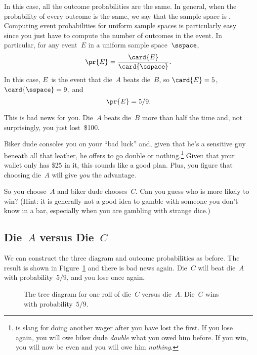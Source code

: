 In this case, all the outcome probabilities are the same.  In general,
when the probability of every outcome is the same, we say that the
sample space is .  Computing event probabilities for
uniform sample spaces is particularly easy since you just have to
compute the number of outcomes in the event.  In particular, for any
event~$E$ in a uniform sample space~$\sspace$,
\begin{equation}\label{eqn:14F1}
    \pr{E} = \frac{\card{E}}{\card{\sspace}}.
\end{equation}
In this case, $E$~is the event that die~$A$ beats die~$B$, so
$\card{E} = 5$, \ $\card{\sspace} = 9$, and
\begin{equation*}
    \pr{E} = 5/9.
\end{equation*}

This is bad news for you.  Die~$A$ beats die~$B$ more than half the
time and, not surprisingly, you just lost~\$100.

Biker dude consoles you on your ``bad luck'' and, given that he's a
sensitive guy beneath all that leather, he offers to go double or
nothing.\footnote{ is slang for doing another
  wager after you have lost the first.  If you lose again, you will
  owe biker dude \emph{double} what you owed him before.  If you win,
  you will now be even and you will owe him \emph{nothing}.}  Given
that your wallet only has \$25 in it, this sounds like a good plan.
Plus, you figure that choosing die~$A$ will give \emph{you} the
advantage.

So you choose~$A$ and biker dude chooses~$C$.  Can you guess who is
more likely to win?  (Hint: it is generally not a good idea to gamble
with someone you don't know in a bar, especially when you are gambling
with strange dice.)

\subsection{Die~$A$ versus Die~$C$}

We can construct the three diagram and outcome probabilities as
before.  The result is shown in Figure~\ref{fig:14A9} and there is bad
news again.  Die~$C$ will beat die~$A$ with probability~$5/9$, and you
lose once again.

\begin{figure}


\caption{The tree diagram for one roll of die~$C$ versus die~$A$.
  Die~$C$ wins with probability~$5/9$.}

\label{fig:14A9}

\end{figure}

